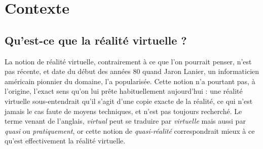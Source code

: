 \section{Contexte}


\subsection{Qu'est-ce que la réalité virtuelle ?}La notion de réalité virtuelle, contrairement à ce que l'on pourrait penser, n'est pas récente, et date du début des années 80 quand Jaron Lanier, un informaticien américain pionnier du domaine, l'a popularisée. Cette notion n'a pourtant pas, à l'origine, l'exact sens qu'on lui prête habituellement aujourd'hui : une réalité virtuelle sous-entendrait qu'il s'agit d'une copie exacte de la réalité, ce qui n'est jamais le cas faute de moyens techniques, et n'est pas toujours recherché. Le terme venant  de l'anglais, \emph{virtual} peut se traduire par \emph{virtuelle} mais aussi par \emph{quasi} ou \emph{pratiquement}, or cette notion de \emph{quasi-réalité} correspondrait mieux à ce qu'est effectivement la réalité virtuelle. 
\\

